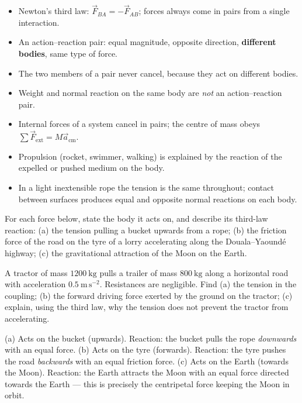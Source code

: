 \documentclass[11pt]{article}
\newcounter{popsec}
\newcounter{popsub}
\newcommand{\courssub}[1]{%
  \stepcounter{popsub}%
  \par\vspace{9pt}\noindent{\popxbold\fontsize{11.5}{13}\selectfont\color{popink}{\color{poporange}\thepopsec.\thepopsub}\hspace{6pt}#1}\par\nopagebreak\vspace{4pt}
}
\begin{document}
\courssub{Consolidation}

\begin{aretenir}
\begin{itemize}
\item Newton's third law: $\vec{F}_{BA} = -\vec{F}_{AB}$; forces always come in pairs from a single interaction.
\item An action--reaction pair: equal magnitude, opposite direction, \textbf{different bodies}, same type of force.
\item The two members of a pair never cancel, because they act on different bodies.
\item Weight and normal reaction on the same body are \emph{not} an action--reaction pair.
\item Internal forces of a system cancel in pairs; the centre of mass obeys $\sum \vec{F}_{\text{ext}} = M\vec{a}_{\text{cm}}$.
\item Propulsion (rocket, swimmer, walking) is explained by the reaction of the expelled or pushed medium on the body.
\item In a light inextensible rope the tension is the same throughout; contact between surfaces produces equal and opposite normal reactions on each body.
\end{itemize}
\end{aretenir}

\begin{exercice}
For each force below, state the body it acts on, and describe its third-law reaction: (a) the tension pulling a bucket upwards from a rope; (b) the friction force of the road on the tyre of a lorry accelerating along the Douala--Yaoundé highway; (c) the gravitational attraction of the Moon on the Earth.
\end{exercice}

\begin{exercice}
A tractor of mass $1200\ \mathrm{kg}$ pulls a trailer of mass $800\ \mathrm{kg}$ along a horizontal road with acceleration $0.5\ \mathrm{m\,s^{-2}}$. Resistances are negligible. Find (a) the tension in the coupling; (b) the forward driving force exerted by the ground on the tractor; (c) explain, using the third law, why the tension does not prevent the tractor from accelerating.
\end{exercice}

\begin{corrige}[Exercise 1]
(a) Acts on the bucket (upwards). Reaction: the bucket pulls the rope \emph{downwards} with an equal force. (b) Acts on the tyre (forwards). Reaction: the tyre pushes the road \emph{backwards} with an equal friction force. (c) Acts on the Earth (towards the Moon). Reaction: the Earth attracts the Moon with an equal force directed towards the Earth --- this is precisely the centripetal force keeping the Moon in orbit.
\end{corrige}
\end{document}
